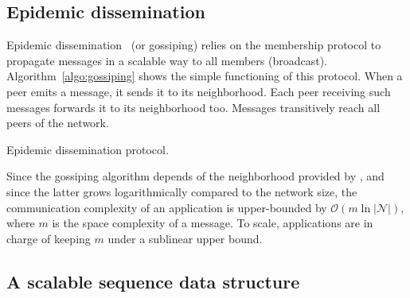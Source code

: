 

\subsection{Epidemic dissemination}
\label{subsec:gossiping}

Epidemic dissemination~\cite{birman1999bimodal,demers1987epidemic} (or
gossiping) relies on the membership protocol to propagate messages in a scalable
way to all members (broadcast). Algorithm~\ref{algo:gossiping} shows the simple
functioning of this protocol. When a peer emits a message, it sends it to its
neighborhood. Each peer receiving such messages forwards it to its neighborhood
too. Messages transitively reach all peers of the network.

\begin{algorithm}[h]
  
  \caption{\label{algo:gossiping}Epidemic dissemination protocol.}
\end{algorithm}

Since the gossiping algorithm depends of the neighborhood provided by \SPRAY,
and since the latter grows logarithmically compared to the network size, the
communication complexity of an application is upper-bounded by
$\mathcal{O}(m \ln |\mathcal{N}|)$, where $m$ is the space complexity of a
message. To scale, applications are in charge of keeping $m$ under a sublinear
upper bound.




\subsection{A scalable sequence data structure}

